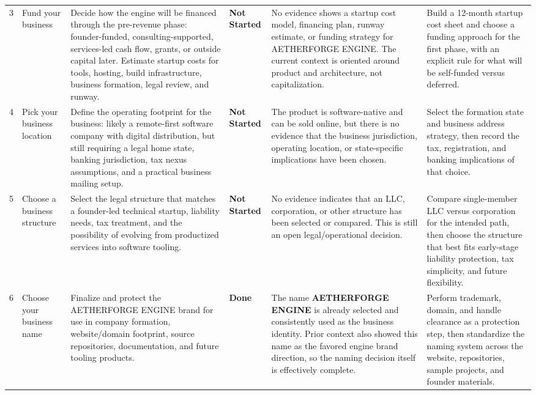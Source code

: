 \documentclass[10pt]{article}
\newcommand{\Status}[1]{\textbf{#1}}
\begin{document}
\begin{landscape}
\begin{longtable}{L{0.45in}L{1.35in}L{1.95in}L{0.80in}L{1.85in}L{1.85in}}
3 & Fund your business & Decide how the engine will be financed through the pre-revenue phase: founder-funded, consulting-supported, services-led cash flow, grants, or outside capital later. Estimate startup costs for tools, hosting, build infrastructure, business formation, legal review, and runway. & \Status{Not Started} & No evidence shows a startup cost model, financing plan, runway estimate, or funding strategy for AETHERFORGE ENGINE. The current context is oriented around product and architecture, not capitalization. & Build a 12-month startup cost sheet and choose a funding approach for the first phase, with an explicit rule for what will be self-funded versus deferred. \\

4 & Pick your business location & Define the operating footprint for the business: likely a remote-first software company with digital distribution, but still requiring a legal home state, banking jurisdiction, tax nexus assumptions, and a practical business mailing setup. & \Status{Not Started} & The product is software-native and can be sold online, but there is no evidence that the business jurisdiction, operating location, or state-specific implications have been chosen. & Select the formation state and business address strategy, then record the tax, registration, and banking implications of that choice. \\

5 & Choose a business structure & Select the legal structure that matches a founder-led technical startup, liability needs, tax treatment, and the possibility of evolving from productized services into software tooling. & \Status{Not Started} & No evidence indicates that an LLC, corporation, or other structure has been selected or compared. This is still an open legal/operational decision. & Compare single-member LLC versus corporation for the intended path, then choose the structure that best fits early-stage liability protection, tax simplicity, and future flexibility. \\

6 & Choose your business name & Finalize and protect the AETHERFORGE ENGINE brand for use in company formation, website/domain footprint, source repositories, documentation, and future tooling products. & \Status{Done} & The name \textbf{AETHERFORGE ENGINE} is already selected and consistently used as the business identity. Prior context also showed this name as the favored engine brand direction, so the naming decision itself is effectively complete. & Perform trademark, domain, and handle clearance as a protection step, then standardize the naming system across the website, repositories, sample projects, and founder materials. \\


\end{longtable}
\end{landscape}
\end{document}
